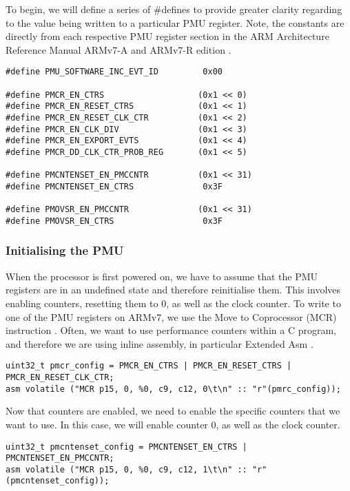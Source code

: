 {To begin, we will define a series of \#defines to provide greater clarity regarding to the value being written to a particular PMU register. Note, the constants are directly from each respective PMU register section in the ARM Architecture Reference Manual ARMv7-A and ARMv7-R edition \cite{DocsArvm7}.

\lstset{language=C}
\begin{lstlisting}
#define PMU_SOFTWARE_INC_EVT_ID         0x00

#define PMCR_EN_CTRS                   (0x1 << 0)
#define PMCR_EN_RESET_CTRS             (0x1 << 1)
#define PMCR_EN_RESET_CLK_CTR          (0x1 << 2)
#define PMCR_EN_CLK_DIV                (0x1 << 3)
#define PMCR_EN_EXPORT_EVTS            (0x1 << 4)
#define PMCR_DD_CLK_CTR_PROB_REG       (0x1 << 5)

#define PMCNTENSET_EN_PMCCNTR          (0x1 << 31)
#define PMCNTENSET_EN_CTRS              0x3F

#define PMOVSR_EN_PMCCNTR              (0x1 << 31)
#define PMOVSR_EN_CTRS                  0x3F
\end{lstlisting}

\subsubsection{Initialising the PMU}

When the processor is first powered on, we have to assume that the PMU registers are in an undefined state and therefore reinitialise them. This involves enabling counters, resetting them to 0, as well as the clock counter. To write to one of the PMU registers on ARMv7, we use the Move to Coprocessor (MCR) instruction \cite{DocsArmMCR}. Often, we want to use performance counters within a C program, and therefore we are using inline assembly, in particular Extended Asm \cite{DocsGCCExtendedAsm}.

\lstset{language=C}
\begin{lstlisting}
uint32_t pmcr_config = PMCR_EN_CTRS | PMCR_EN_RESET_CTRS | PMCR_EN_RESET_CLK_CTR;
asm volatile ("MCR p15, 0, %0, c9, c12, 0\t\n" :: "r"(pmrc_config));
\end{lstlisting}

Now that counters are enabled, we need to enable the specific counters that we want to use. In this case, we will enable counter 0, as well as the clock counter.

\lstset{language=C}
\begin{lstlisting}
uint32_t pmcntenset_config = PMCNTENSET_EN_CTRS | PMCNTENSET_EN_PMCCNTR;
asm volatile ("MCR p15, 0, %0, c9, c12, 1\t\n" :: "r"(pmcntenset_config));
\end{lstlisting}

}
